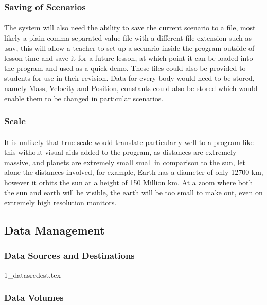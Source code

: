 \subsubsection{Saving of Scenarios}

\paragraph{}
The system will also need the ability to save the current scenario to a file, most likely a plain comma separated value file with a different file extension such as .sav, this will allow a teacher to set up a scenario inside the program outside of lesson time and save it for a future lesson, at which point it can be loaded into the program and used as a quick demo. These files could also be provided to students for use in their revision. Data for every body would need to be stored, namely Mass, Velocity and Position, constants could also be stored which would enable them to be changed in particular scenarios.

\subsubsection{Scale}

\paragraph{}
It is unlikely that true scale would translate particularly well to a program like this without visual aids added to the program, as distances are extremely massive, and planets are extremely small small in comparison to the sun, let alone the distances involved, for example, Earth has a diameter of only 12700 km, however it orbits the sun at a height of 150 Million km. At a zoom where both the sun and earth will be visible, the earth will be too small to make out, even on extremely high resolution monitors.

\subsection{Data Management}
\subsubsection{Data Sources and Destinations}
{1_datasrcdest.tex}

\subsubsection{Data Volumes}
